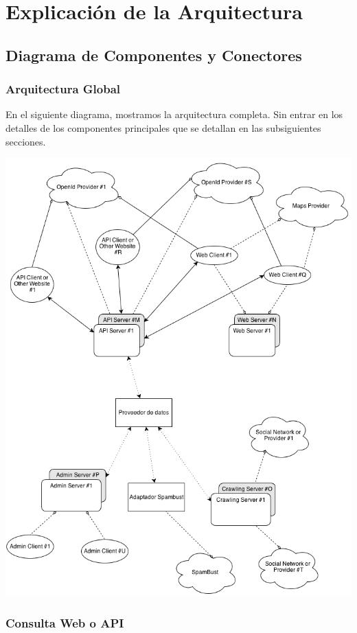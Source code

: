 \section*{Explicaci\'on de la Arquitectura}

\subsection*{Diagrama de Componentes y Conectores}

\subsubsection*{Arquitectura Global}

En el siguiente diagrama, mostramos la arquitectura completa. Sin entrar en los detalles de los componentes principales que se detallan en las subsiguientes secciones.

\includegraphics[scale=0.5]{ISW2_cNc_Global}


\subsubsection*{Consulta Web o API}

